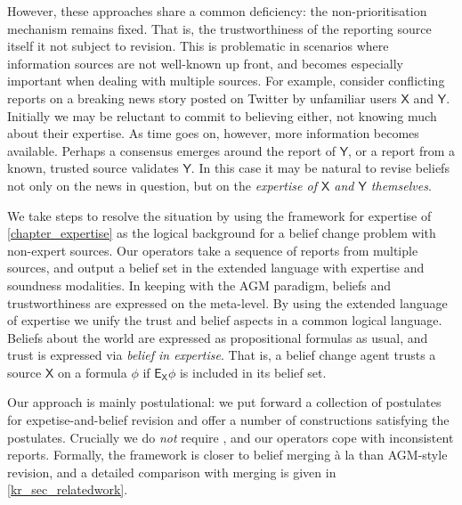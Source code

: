 {However, these approaches share a common deficiency: the non-prioritisation
mechanism remains fixed. That is, the trustworthiness of the reporting source
itself it not subject to revision. This is problematic in scenarios where
information sources are not well-known up front, and becomes especially
important when dealing with multiple sources. For example, consider conflicting
reports on a breaking news story posted on Twitter by unfamiliar users
$\mathsf{X}$ and $\mathsf{Y}$.  Initially we may be reluctant to commit to
believing either, not knowing much about their expertise. As time goes on,
however, more information becomes available. Perhaps a consensus emerges around
the report of $\mathsf{Y}$, or a report from a known, trusted source validates
$\mathsf{Y}$. In this case it may be natural to revise beliefs not only on the
news in question, but on the \emph{expertise of $\mathsf{X}$ and $\mathsf{Y}$
themselves}.

We take steps to resolve the situation by using the framework for expertise of
\cref{chapter_expertise} as the logical background for a belief change problem
with non-expert sources. Our operators take a sequence of reports from multiple
sources, and output a belief set in the extended language with expertise and
soundness modalities. In keeping with the AGM paradigm, beliefs and
trustworthiness are expressed on the meta-level. By using the extended language
of expertise we unify the trust and belief aspects in a common logical
language.\footnotemark{} Beliefs about the world are expressed as propositional
formulas as usual, and trust is expressed via \emph{belief in expertise}. That
is, a belief change agent trusts a source $\mathsf{X}$ on a formula $\phi$ if
$\mathsf{E}_{\mathsf{X}}\phi$ is included in its belief set.


Our approach is mainly postulational: we put forward a collection of postulates
for expetise-and-belief revision and offer a number of constructions satisfying
the postulates. Crucially we do \emph{not} require , and our
operators cope with inconsistent reports. Formally, the framework is closer to
belief merging {\`a} la \textcite{konieczny2002merging} than AGM-style
revision, and a detailed comparison with merging is given in
\cref{kr_sec_relatedwork}.

}
